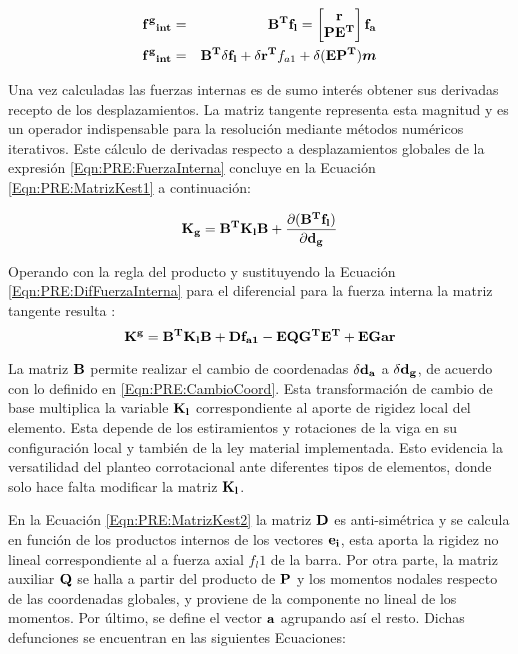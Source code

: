 \begin{eqnarray}\label{Eqn:PRE:FuerzaInterna}
	\bf{f^g}_{int}&=&\bf{B}^T\bf{f_l}= \begin{bmatrix}
		\bf{r}\\ 
		\bf{PE^T}
	\end{bmatrix}\bf{f_a}\\
    \label{Eqn:PRE:DifFuerzaInterna} 
	\bf{f^g}_{int}&=&\bf{B}^T\delta\bf{f_l}+\delta\bf{r}^T \text{$f_{a1}$}+\delta(\bf{EP^T}) \boldsymbol{m} 
\end{eqnarray} 

Una vez calculadas las fuerzas internas es de sumo interés obtener sus derivadas recepto de los desplazamientos. La matriz tangente representa esta magnitud y es un operador indispensable para la resolución mediante métodos numéricos iterativos. Este cálculo de derivadas respecto a desplazamientos globales de la expresión \eqref{Eqn:PRE:FuerzaInterna} concluye en la Ecuación \eqref{Eqn:PRE:MatrizKest1} a continuación: 

\begin{equation}\label{Eqn:PRE:MatrizKest1}
\bf{K_g}=\bf{B}^T\bf{K_l}\bf{B}+\frac{\partial (\bf{B}^T\bf{f}_l)}{\partial \bf{d}_g}
\end{equation}

Operando con la regla del producto y sustituyendo la Ecuación \eqref{Eqn:PRE:DifFuerzaInterna} para el diferencial para la fuerza interna la matriz tangente resulta : 
\begin{equation} \label{Eqn:PRE:MatrizKest2}
	\bf{K}^g=\bf{B}^T\bf{K_l}\bf{B}+\bf{D} f_{a1}-\bf{E}\bf{Q}\bf{G^T}\bf{E^T} +\bf{EGar}
\end{equation}


La matriz $\bf{B}$ permite realizar el cambio de coordenadas $\delta \bf{d_a}$ a  $\delta \bf{d_g}$, de acuerdo con lo definido en \eqref{Eqn:PRE:CambioCoord}. Esta transformación de cambio de base multiplica la variable $\bf{K_l}$ correspondiente al aporte de rigidez local del elemento. Esta depende de los estiramientos y rotaciones de la viga en su configuración local y también de la ley material implementada. Esto evidencia la versatilidad del planteo corrotacional ante diferentes tipos de elementos, donde solo hace falta modificar la matriz $\bf{K_l}$.  


En la Ecuación \eqref{Eqn:PRE:MatrizKest2} la matriz  $\bf{D}$ es anti-simétrica y se calcula en función de los productos internos de los vectores $\bf{e_i}$, esta aporta la rigidez no lineal correspondiente al a fuerza axial $f_l1$ de la barra. Por otra parte, la matriz auxiliar $\bf{Q}$ se halla a partir del producto de $\bf{P}$ y los momentos nodales respecto de las coordenadas globales, y proviene de la componente no lineal de los momentos. Por último, se define el vector $\bf{a}$ agrupando así el resto. Dichas defunciones se encuentran en las siguientes Ecuaciones:

